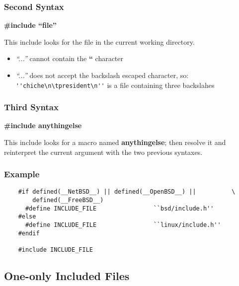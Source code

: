 \documentclass[8pt]{beamer}
\newcommand{\nl}[0]{\vspace{0.4cm}}
\begin{document}

\begin{frame}[containsverbatim]
  \frametitle{Second Syntax}

  \textbf{\#include ``file''}

  \nl

  This include looks for the file in the current working directory.

  \begin{itemize}
  \item
    \textit{``...''} cannot contain the \textbf{``} character
  \item
    \textit{``...''} does not accept the backslash escaped character,
    so: \verb|''chiche\n\tpresident\n''| is a file containing
    three backslahes
  \end{itemize}
\end{frame}


\begin{frame}[containsverbatim]
  \frametitle{Third Syntax}

  \textbf{\#include anythingelse}

  \nl

  This include looks for a macro named \textbf{anythingelse}; then resolve
  it and reinterpret the current argument with the two previous syntaxes.
\end{frame}


\begin{frame}[containsverbatim]
  \frametitle{Example}

  \begin{verbatim}
    #if defined(__NetBSD__) || defined(__OpenBSD__) ||          \
        defined(__FreeBSD__)
      #define INCLUDE_FILE                ``bsd/include.h''
    #else
      #define INCLUDE_FILE                ``linux/include.h''
    #endif

    #include INCLUDE_FILE
  \end{verbatim}
\end{frame}

%
%

\subsection{One-only Included Files}

\end{document}
